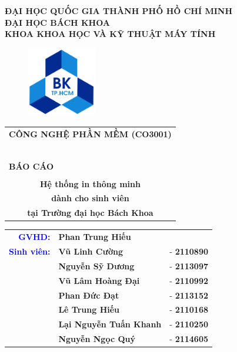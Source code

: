 \documentclass[a4paper]{article}
\begin{document}
\begin{titlepage}
\begin{center}
\textbf{ ĐẠI HỌC QUỐC GIA THÀNH PHỐ HỒ CHÍ MINH \\
ĐẠI HỌC BÁCH KHOA  \\
KHOA KHOA HỌC VÀ KỸ THUẬT MÁY TÍNH }\\
\end{center}

\vspace{1cm}

\begin{figure}[h!]
\begin{center}
\includegraphics[width=3cm]{hcmut.png}
\end{center}
\end{figure}

\begin{center}
\begin{tabular}{c}
\multicolumn{1}{l}{\textbf{{\Large CÔNG NGHỆ PHẦN MỀM (CO3001)}}}\\
~~\\
\hline
\\
\multicolumn{1}{l}{\textbf{{\Large BÁO CÁO}}}\\
\\
 \textbf{{\Huge Hệ thống in thông minh}}  \\

\textbf{{\Huge  dành cho sinh viên }}
\\
\textbf{{\Huge tại Trường đại học Bách Khoa}}
\\
\hline
\end{tabular}
\end{center}

\vspace{3cm}

\begin{table}[h]
\begin{tabular}{rll}
\hspace{5cm}
\textcolor{blue}{\textbf{GVHD:}} & \textbf{Phan Trung Hiếu} & \\
\textcolor{blue}{\textbf{Sinh viên:}} & \textbf{Vũ Linh Cường} & - \textbf{2110890} \\
 & \textbf{Nguyễn Sỹ Dương} & - \textbf{2113097} \\
 & \textbf{Vũ Lâm Hoàng Đại} & - \textbf{2110992} \\
 & \textbf{Phan Đức Đạt} & - \textbf{2113152} \\
 & \textbf{Lê Trung Hiếu} & - \textbf{2110168} \\
 & \textbf{Lại Nguyễn Tuấn Khanh} & - \textbf{2110250} \\
 & \textbf{Nguyễn Ngọc Quý} & - \textbf{2114605} \\
\end{tabular}
\end{table}


\end{titlepage}
\end{document}
